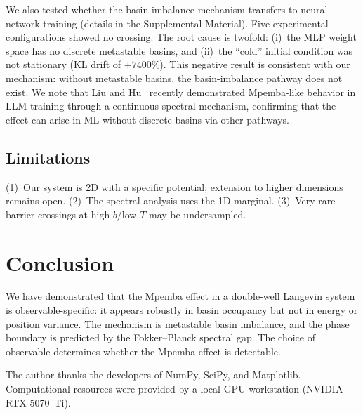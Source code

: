 \documentclass[aps,pre,reprint,superscriptaddress,showpacs]{revtex4-2}
\begin{document}
We also tested whether the basin-imbalance mechanism transfers to neural
network training (details in the Supplemental Material). Five experimental
configurations showed no crossing. The root cause is twofold: (i)~the MLP
weight space has no discrete metastable basins, and (ii)~the ``cold'' initial
condition was not stationary (KL drift of $+7400\%$). This negative result is
consistent with our mechanism: without metastable basins, the basin-imbalance
pathway does not exist. We note that Liu and Hu~\cite{Liu2025} recently
demonstrated Mpemba-like behavior in LLM training through a continuous spectral
mechanism, confirming that the effect can arise in ML without discrete basins
via other pathways.

\subsection{Limitations}

(1)~Our system is 2D with a specific potential; extension to higher dimensions
remains open. (2)~The spectral analysis uses the 1D marginal. (3)~Very rare
barrier crossings at high $b$/low $T$ may be undersampled.

\section{Conclusion}

We have demonstrated that the Mpemba effect in a double-well Langevin system is
observable-specific: it appears robustly in basin occupancy but not in energy or
position variance. The mechanism is metastable basin imbalance, and the phase
boundary is predicted by the Fokker--Planck spectral gap. The choice of
observable determines whether the Mpemba effect is detectable.

\begin{acknowledgments}
The author thanks the developers of NumPy, SciPy, and Matplotlib. Computational
resources were provided by a local GPU workstation (NVIDIA RTX 5070~Ti).
\end{acknowledgments}
\end{document}
